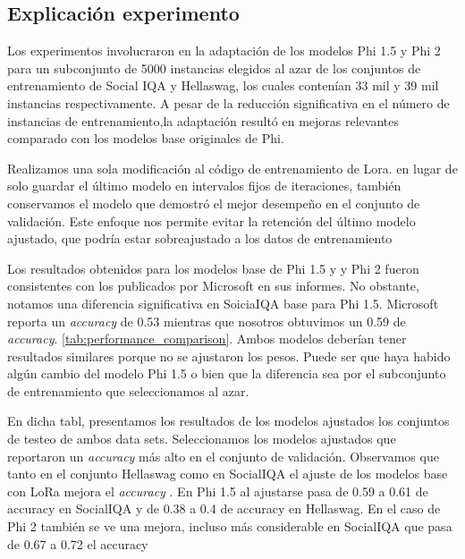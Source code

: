 \subsection{Explicación experimento}

Los experimentos involucraron en la adaptación de los modelos Phi 1.5 y Phi 2 para un subconjunto de 5000 instancias elegidos al azar de los conjuntos de entrenamiento de Social IQA y Hellaswag, los cuales contenían 33 mil y 39 mil instancias respectivamente. A pesar de la reducción significativa en el número de instancias de entrenamiento,la adaptación resultó en mejoras relevantes comparado con los modelos base originales de Phi.

Realizamos una sola modificación al código de entrenamiento de Lora. en lugar de solo guardar el último modelo en intervalos fijos de iteraciones, también conservamos el modelo que demostró el mejor desempeño en el conjunto de validación. Este enfoque nos permite evitar la retención del último modelo ajustado, que podría estar sobreajustado a los datos de entrenamiento

Los resultados obtenidos para los modelos base de Phi 1.5 y y Phi 2 fueron consistentes con los publicados por Microsoft en sus informes. \cite{abdin2024phi3} \cite{li2023textbooks} No obstante, notamos una diferencia significativa en SoiciaIQA base para Phi 1.5. Microsoft reporta un \textit{accuracy} de 0.53
mientras que nosotros obtuvimos un 0.59 de \textit{accuracy}.  \ref{tab:performance_comparison}. Ambos modelos deberían tener resultados similares porque no se ajustaron los pesos. Puede ser que haya habido algún cambio del modelo Phi 1.5 o bien que la diferencia sea por el subconjunto de entrenamiento que seleccionamos al azar.

En dicha tabl, presentamos los resultados de los modelos ajustados los conjuntos de testeo de ambos data sets. Seleccionamos los modelos ajustados que reportaron un \textit{accuracy} más alto en el conjunto de validación. Observamos que tanto en el conjunto Hellaswag como en SocialIQA el ajuste de los modelos base con LoRa mejora el \textit{accuracy} . En Phi 1.5 al ajustarse pasa de 0.59 a 0.61 de accuracy en SocialIQA y de 0.38 a 0.4 de accuracy en Hellaswag. En el caso de Phi 2 también se ve una mejora, incluso más considerable en SocialIQA que pasa de 0.67 a 0.72 el accuracy 

